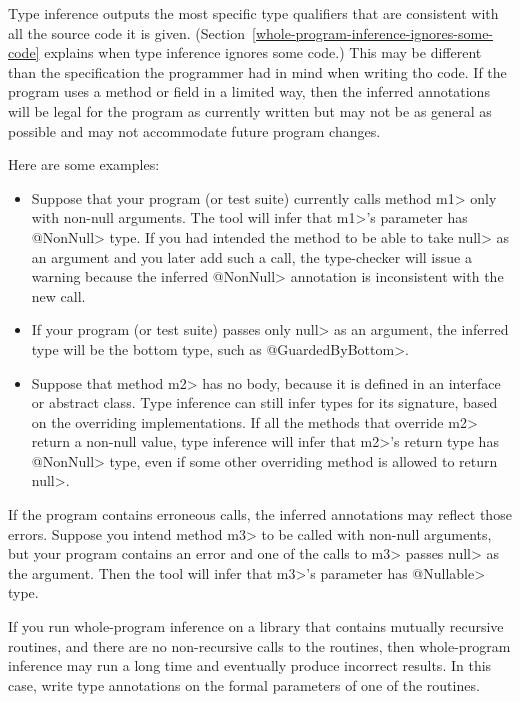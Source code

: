 
Type inference outputs the most specific type qualifiers that are
consistent with all the source code it is given.
(Section~\ref{whole-program-inference-ignores-some-code}
explains when type inference ignores some code.)
This may be different than the specification the programmer had in mind
when writing tho code.
If the program uses a method or field in a limited way, then the inferred
annotations will be legal for the program as
currently written but may not be as general as possible and may not
accommodate future program changes.

Here are some examples:

\begin{itemize}
\item
Suppose that your program (or test suite) currently calls
method \<m1> only with non-null
arguments.  The tool will infer that \<m1>'s parameter has
\<@NonNull> type.  If you had intended the method to be able to
take \<null> as an argument and you later add such a call, the type-checker
will issue a warning because the inferred \<@NonNull>
annotation is inconsistent with the new call.

\item
If your program (or test suite) passes only \<null> as an argument, the
inferred type will be the bottom type, such as \<@GuardedByBottom>.

\item
Suppose that method \<m2> has no body, because it is defined in an interface or
abstract class.
Type inference can still infer types for its signature, based on the
overriding implementations.
If all the methods that override \<m2> return a non-null value, type
inference will infer that \<m2>'s return type has \<@NonNull> type, even if
some other overriding method is allowed to return
\<null>.

\end{itemize}

If the program contains erroneous calls, the
inferred annotations may reflect those errors.
Suppose you intend method \<m3> to be called with
non-null arguments, but your program contains an error and one of the calls
to \<m3> passes \<null> as the argument.  Then the tool will infer that
\<m3>'s parameter has \<@Nullable> type.

If you run whole-program inference on a library that contains mutually
recursive routines, and there are no non-recursive calls to the routines,
then whole-program inference may run a long time and eventually produce
incorrect results.  In this case, write type annotations on the formal
parameters of one of the routines.

